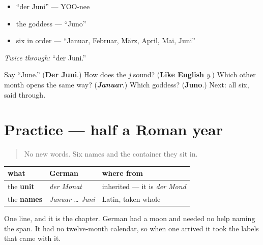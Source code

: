 \begin{itemize}
\raggedright
  \item \textquotedblleft{}der Juni\textquotedblright{} — YOO-nee
  \item the goddess — \textquotedblleft{}Juno\textquotedblright{}
  \item six in order — \textquotedblleft{}Januar, Februar, März, April, Mai, Juni\textquotedblright{}
\end{itemize}

\emph{Twice through:} \textquotedblleft{}der Juni.\textquotedblright{}

\begin{tcolorbox}[breakable,colback=teal!4,colframe=teal!35!black,title={Before you move on}]
Say \textquotedblleft{}June.\textquotedblright{} (\textbf{Der Juni}.) How does the \emph{j} sound? (\textbf{Like English} \emph{y}.) Which other month opens the same way? (\emph{\textbf{Januar}}.) Which goddess? (\textbf{Juno}.) Next: all six, said through.
\end{tcolorbox}
\section[Practice]{Practice — half a Roman year}

\label{lesson:GE-C09-monate-praxis}



\begin{quote}
No new words. Six names and the container they sit in.
\end{quote}

\begin{grammarlens}[title={Grammar Lens: what German owns and what it bought}]
\noindent
\begin{tabularx}{\linewidth}{@{}>{\raggedright\arraybackslash}X>{\raggedright\arraybackslash}X>{\raggedright\arraybackslash}X@{}}
\toprule
\textbf{what} & \textbf{German} & \textbf{where from} \\
\midrule
the \textbf{unit} & \emph{der Monat} & inherited — it is \emph{der Mond} \\
the \textbf{names} & \emph{Januar … Juni} & Latin, taken whole \\
\bottomrule
\end{tabularx}

One line, and it is the chapter. German had a moon and needed no help naming the span. It had no twelve-month calendar, so when one arrived it took the labels that came with it.
\end{grammarlens}

